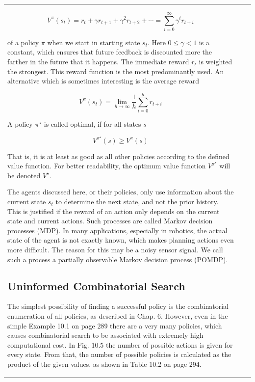 \documentclass[10pt]{book}
\begin{document}
\begin{center}
\begin{tabular}{|l|l|l|}
\begin{equation*}
V^{\pi}\left(s_{t}\right)=r_{t}+\gamma r_{t+1}+\gamma^{2} r_{t+2}+\cdots=\sum_{i=0}^{\infty} \gamma^{i} r_{t+i} \tag{10.1}
\end{equation*}

of a policy $\pi$ when we start in starting state $s_{t}$. Here $0 \leq \gamma<1$ is a constant, which ensures that future feedback is discounted more the farther in the future that it happens. The immediate reward $r_{t}$ is weighted the strongest. This reward function is the most predominantly used. An alternative which is sometimes interesting is the average reward

\begin{equation*}
V^{\pi}\left(s_{t}\right)=\lim _{h \rightarrow \infty} \frac{1}{h} \sum_{i=0}^{h} r_{t+i} \tag{10.2}
\end{equation*}

A policy $\pi^{\star}$ is called optimal, if for all states $s$

\begin{equation*}
V^{\pi^{\star}}(s) \geq V^{\pi}(s) \tag{10.3}
\end{equation*}

That is, it is at least as good as all other policies according to the defined value function. For better readability, the optimum value function $V^{\pi^{\star}}$ will be denoted $V^{\star}$.

The agents discussed here, or their policies, only use information about the current state $s_{t}$ to determine the next state, and not the prior history. This is justified if the reward of an action only depends on the current state and current actions. Such processes are called Markov decision processes (MDP). In many applications, especially in robotics, the actual state of the agent is not exactly known, which makes planning actions even more difficult. The reason for this may be a noisy sensor signal. We call such a process a partially observable Markov decision process (POMDP).

\subsection{Uninformed Combinatorial Search}
The simplest possibility of finding a successful policy is the combinatorial enumeration of all policies, as described in Chap. 6. However, even in the simple Example 10.1 on page 289 there are a very many policies, which causes combinatorial search to be associated with extremely high computational cost. In Fig. 10.5 the number of possible actions is given for every state. From that, the number of possible policies is calculated as the product of the given values, as shown in Table 10.2 on page 294.


\end{tabular}
\end{center}
\end{document}
